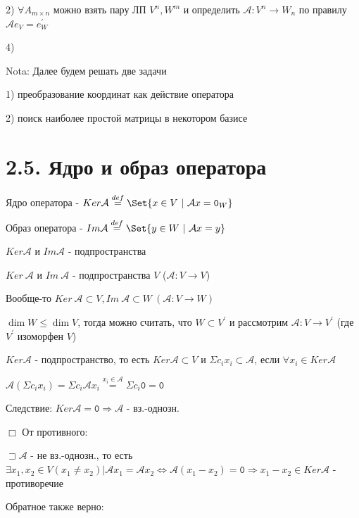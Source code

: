 \documentclass[12pt]{article}
\begin{document}
    2) $\forall A_{m\times n}$ можно взять пару ЛП $V^n, W^m$ и определить $\mathcal{A} : V^n \rightarrow W_n$ по правилу $\mathcal{A}e_V = e_W^\prime$

    4) \Lab

    Nota: Далее будем решать две задачи

    1) преобразование координат как действие оператора

    2) поиск наиболее простой матрицы в некотором базисе

    \section{2.5. Ядро и образ оператора}

    \Def Ядро оператора - $Ker \mathcal{A} \stackrel{def}{=} \Set{x \in V \ | \ \mathcal{A}x = \texttt{0}_W}$

    \Def Образ оператора - $Im \mathcal{A} \stackrel{def}{=} \Set{y \in W \ | \ \mathcal{A}x = y}$

    \Nota $Ker \mathcal{A}$ и $Im \mathcal{A}$ - подпространства



    \Nota $Ker\ \mathcal{A}$ и $Im\ \mathcal{A}$ - подпространства $V$ ($\mathcal{A} : V \rightarrow V$)

    Вообще-то $Ker\ \mathcal{A} \subset V, Im\ \mathcal{A} \subset W \ (\mathcal{A} : V \rightarrow W)$

    $\dim W \leq \dim V$, тогда можно считать, что $W \subset V^\prime$ и
    рассмотрим $\mathcal{A} : V \rightarrow V^\prime$ (где $V^\prime$ изоморфен $V$)

    $Ker \mathcal{A}$ - подпространство, то есть $Ker \mathcal{A} \subset V$ и
    $\Sigma c_i x_i \subset \mathcal{A}$, если $\forall x_i \in Ker \mathcal{A}$

    $\mathcal{A} (\Sigma c_i x_i) = \Sigma c_i \mathcal{A} x_i \stackrel{x_i \in \mathcal{A}}{=} \Sigma c_i \texttt{0} = \texttt{0}$

    Следствие: $Ker \mathcal{A} = \texttt{0} \Longrightarrow \mathcal{A}$ - вз.-однозн.

    $\Box$ От противного:

    $\sqsupset \mathcal{A}$ - не вз.-однозн., то есть $\exists x_1, x_2 \in V (x_1 \neq x_2) | \mathcal{A}x_1 = \mathcal{A}x_2 \Longleftrightarrow \mathcal{A} (x_1 - x_2) = \texttt{0} \Longrightarrow x_1 - x_2 \in Ker \mathcal{A}$ - противоречие

    \Nota Обратное также верно:
\end{document}
